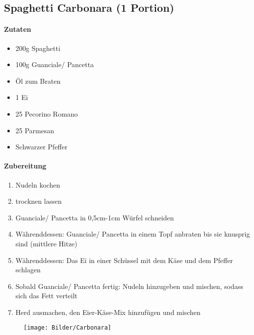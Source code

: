 \newpage
\subsection{Spaghetti Carbonara (1 Portion)}
\paragraph{Zutaten}
\begin{itemize}[noitemsep]
	\item 200g Spaghetti
	\item 100g Guanciale/ Pancetta
	\item Öl zum Braten
	\item 1 Ei
	\item 25 Pecorino Romano
	\item 25 Parmesan
	\item Schwarzer Pfeffer
\end{itemize}
\paragraph{Zubereitung}
\begin{enumerate}[noitemsep]
	\item Nudeln kochen
	\item trocknen lassen
	\item Guanciale/ Pancetta in 0,5cm-1cm Würfel schneiden
	\item Währenddessen: Guanciale/ Pancetta in einem Topf anbraten bis sie knusprig sind (mittlere Hitze)
	\item Währenddessen: Das Ei in einer Schüssel mit dem Käse und dem Pfeffer schlagen
	\item Sobald Guanciale/ Pancetta fertig: Nudeln hinzugeben und mischen, sodass sich das Fett verteilt
	\item Herd ausmachen, den Eier-Käse-Mix hinzufügen und mischen 
\end{enumerate}
\vspace{1.5cm}
\begin{figure}[h]
\centering
\texttt{[image: Bilder/Carbonara]}
\end{figure}